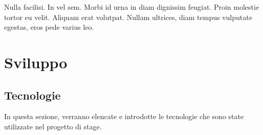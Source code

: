 \begin{savequote}[75mm]
Nulla facilisi. In vel sem. Morbi id urna in diam dignissim feugiat. Proin molestie tortor eu velit. Aliquam erat volutpat. Nullam ultrices, diam tempus vulputate egestas, eros pede varius leo.
\end{savequote}

\chapter{Sviluppo}
\section{Tecnologie}
In questa sezione, verranno elencate e introdotte le tecnologie che sono state utilizzate nel progetto di stage.

